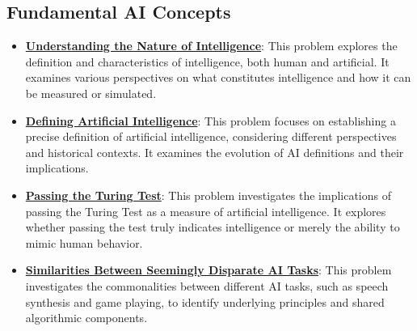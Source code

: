 \documentclass{article}%
\begin{document}
\subsection{Fundamental AI Concepts}%
\label{subsec:FundamentalAIConcepts}%
\begin{itemize}[leftmargin=*]%
\item \href{https://purdue.brightspace.com/d2l/common/assets/pdfjs-d2l-dist/1.0.14-legacy/web/viewer.html?file=\%2Fcontent\%2Fenforced\%2F1095467-wl.202510.CS.24300.001\%2F02L2-Intro.pdf\%3Fou\%3D1095467\&lang=en-us\&container=d2l-fileviewer-rendered-pdf\&fullscreen=d2l-fileviewer-rendered-pdf-dialog\&height=667#page=5}{\textbf{Understanding the Nature of Intelligence}}: This problem explores the definition and characteristics of intelligence, both human and artificial. It examines various perspectives on what constitutes intelligence and how it can be measured or simulated.%
\item \href{https://purdue.brightspace.com/d2l/common/assets/pdfjs-d2l-dist/1.0.14-legacy/web/viewer.html?file=\%2Fcontent\%2Fenforced\%2F1095467-wl.202510.CS.24300.001\%2F02L2-Intro.pdf\%3Fou\%3D1095467\&lang=en-us\&container=d2l-fileviewer-rendered-pdf\&fullscreen=d2l-fileviewer-rendered-pdf-dialog\&height=667#page=5}{\textbf{Defining Artificial Intelligence}}: This problem focuses on establishing a precise definition of artificial intelligence, considering different perspectives and historical contexts. It examines the evolution of AI definitions and their implications.%
\item \href{https://purdue.brightspace.com/d2l/common/assets/pdfjs-d2l-dist/1.0.14-legacy/web/viewer.html?file=\%2Fcontent\%2Fenforced\%2F1095467-wl.202510.CS.24300.001\%2F02L2-Intro.pdf\%3Fou\%3D1095467\&lang=en-us\&container=d2l-fileviewer-rendered-pdf\&fullscreen=d2l-fileviewer-rendered-pdf-dialog\&height=667#page=6}{\textbf{Passing the Turing Test}}: This problem investigates the implications of passing the Turing Test as a measure of artificial intelligence. It explores whether passing the test truly indicates intelligence or merely the ability to mimic human behavior.%
\item \href{https://purdue.brightspace.com/d2l/common/assets/pdfjs-d2l-dist/1.0.14-legacy/web/viewer.html?file=\%2Fcontent\%2Fenforced\%2F1095467-wl.202510.CS.24300.001\%2F02L2-Intro.pdf\%3Fou\%3D1095467\&lang=en-us\&container=d2l-fileviewer-rendered-pdf\&fullscreen=d2l-fileviewer-rendered-pdf-dialog\&height=667#page=31}{\textbf{Similarities Between Seemingly Disparate AI Tasks}}: This problem investigates the commonalities between different AI tasks, such as speech synthesis and game playing, to identify underlying principles and shared algorithmic components.%
\end{itemize}
\end{document}
